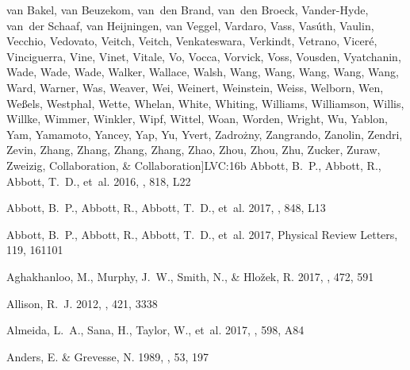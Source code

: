 \documentclass{aa}
\begin{document}
\begin{thebibliography}{242}
{  van Bakel, van Beuzekom, van~den Brand, van~den Broeck, Vander-Hyde, van~der
  Schaaf, van Heijningen, van Veggel, Vardaro, Vass, Vasúth, Vaulin, Vecchio,
  Vedovato, Veitch, Veitch, Venkateswara, Verkindt, Vetrano, Viceré,
  Vinciguerra, Vine, Vinet, Vitale, Vo, Vocca, Vorvick, Voss, Vousden,
  Vyatchanin, Wade, Wade, Wade, Walker, Wallace, Walsh, Wang, Wang, Wang, Wang,
  Wang, Ward, Warner, Was, Weaver, Wei, Weinert, Weinstein, Weiss, Welborn,
  Wen, Weßels, Westphal, Wette, Whelan, White, Whiting, Williams, Williamson,
  Willis, Willke, Wimmer, Winkler, Wipf, Wittel, Woan, Worden, Wright, Wu,
  Yablon, Yam, Yamamoto, Yancey, Yap, Yu, Yvert, Zadrożny, Zangrando, Zanolin,
  Zendri, Zevin, Zhang, Zhang, Zhang, Zhang, Zhao, Zhou, Zhou, Zhu, Zucker,
  Zuraw, Zweizig, Collaboration, \& Collaboration}]{LVC:16b}
Abbott, B.~P., Abbott, R., Abbott, T.~D., {et~al.} 2016, \apjl, 818, L22

{Abbott}, B.~P., {Abbott}, R., {Abbott}, T.~D., {et~al.} 2017{},
  \apjl, 848, L13

{Abbott}, B.~P., {Abbott}, R., {Abbott}, T.~D., {et~al.} 2017{},
  Physical Review Letters, 119, 161101

{Aghakhanloo}, M., {Murphy}, J.~W., {Smith}, N., \& {Hlo{\v z}ek}, R. 2017,
  \mnras, 472, 591

{Allison}, R.~J. 2012, \mnras, 421, 3338

{Almeida}, L.~A., {Sana}, H., {Taylor}, W., {et~al.} 2017, \aap, 598, A84

{Anders}, E. \& {Grevesse}, N. 1989, \gca, 53, 197


\end{thebibliography}
\end{document}
